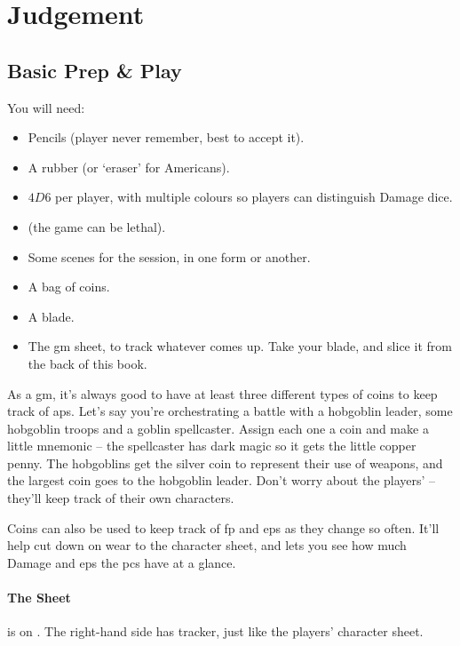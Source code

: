 \chapter[Bastion of Judgement]{Judgement}
\label{judgement}

\section{Basic Prep \& Play}

\begin{multicols}{2}

You will need:

\begin{itemize}
  \item
  Pencils (player never remember, best to accept it).
  \item
  A rubber (or `eraser' for Americans).
  \item
  $4D6$ per player, with multiple colours so players can distinguish Damage dice.
  \item
  \iftoggle{stories}{
    A boat-load of character sheets
  }{
    Some pre-made characters, including spares
  } (the game can be lethal).
  \item
  Some scenes for the session, in one form or another.
  \item
  A bag of coins.
  \item
  A blade.
  \item
  The \gls{gm} sheet, to track whatever comes up.
  Take your blade, and slice it from the back of this book.
\end{itemize}

As a \gls{gm}, it's always good to have at least three different types of coins to keep track of \glspl{ap}.
Let's say you're orchestrating a battle with a hobgoblin leader, some hobgoblin troops and a goblin spellcaster.
Assign each one a coin and make a little mnemonic -- the spellcaster has dark magic so it gets the little copper penny.
The hobgoblins get the silver coin to represent their use of weapons, and the largest coin goes to the hobgoblin leader.
Don't worry about the players'  -- they'll keep track of their own characters.

Coins can also be used to keep track of \gls{fp} and \glspl{ep} as they change so often.
It'll help cut down on wear to the character sheet, and lets you see how much Damage and \glspl{ep} the \glspl{pc} have at a glance.

\subsubsection{The  Sheet}
is on .
The right-hand side has  tracker, just like the players' character sheet.


\end{multicols}
